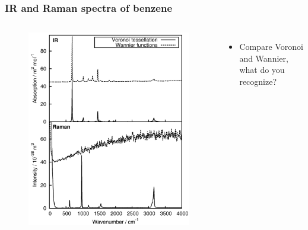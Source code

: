 \documentclass[t]{beamer}
\begin{document}
\begin{frame}
	\frametitle{IR and Raman spectra of benzene}
	\vspace{-.6cm}
	\begin{columns}
		\begin{figure}
			\vspace{-.6cm}
			\includegraphics[width=1.1\textwidth]{figures/benzene_spectra.png}
		\end{figure}
		\vspace{2.5cm}
		\begin{itemize}
			\item Compare Voronoi and Wannier, what do you recognize?
		\end{itemize}
	\end{columns}
\end{frame}
\end{document}
